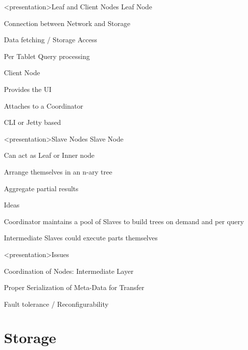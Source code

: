 \begin{frame}<presentation>{Leaf and Client Nodes}
  Leaf Node
  \begin{niitemize}
    \item Connection between Network and Storage
    \item Data fetching / Storage Access
    \item Per Tablet Query processing
  \end{niitemize}
  Client Node
  \begin{niitemize}
    \item Provides the UI
    \item Attaches to a Coordinator
    \item CLI or Jetty based
  \end{niitemize}
\end{frame}

\begin{frame}<presentation>{Slave Nodes}
  Slave Node
  \begin{niitemize}
    \item Can act as Leaf or Inner node
    \item Arrange themselves in an n-ary tree
    \item Aggregate partial results
  \end{niitemize}
  Ideas
  \begin{niitemize}
    \item Coordinator maintains a pool of Slaves to build trees on demand and per query
    \item Intermediate Slaves could execute parts themselves
  \end{niitemize}
\end{frame}

\begin{frame}<presentation>{Issues}
  \begin{niitemize}
   \item Coordination of Nodes: Intermediate Layer
   \item Proper Serialization of Meta-Data for Transfer
   \item Fault tolerance / Reconfigurability
  \end{niitemize}
\end{frame}



\section{Storage}

